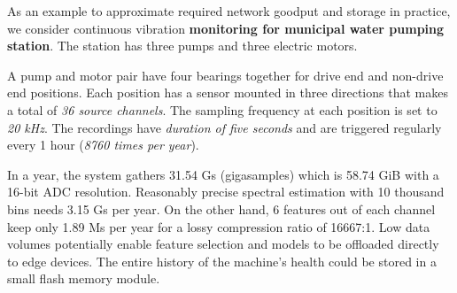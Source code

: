 As an example to approximate required network goodput and storage in practice, we consider continuous vibration \textbf{monitoring for municipal water pumping station}. The station has three pumps and three electric motors. 

A pump and motor pair have four bearings together for drive end and non-drive end positions. Each position has a sensor mounted in three directions that makes a total of \emph{36 source channels}. The sampling frequency at each position is set to \emph{20 kHz}. The recordings have \emph{duration of five seconds} and are triggered regularly every 1 hour (\emph{8760 times per year}).

In a year, the system gathers 31.54 Gs (gigasamples) which is 58.74 GiB with a 16-bit ADC resolution. Reasonably precise spectral estimation with 10 thousand bins needs 3.15 Gs per year. On the other hand, 6 features out of each channel keep only 1.89 Ms per year for a lossy compression ratio of 16667:1. Low data volumes potentially enable feature selection and models to be offloaded directly to edge devices. The entire history of the machine's health could be stored in a small flash memory module.
